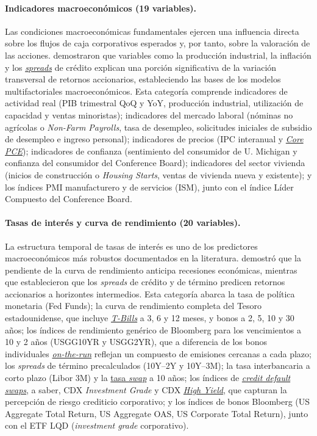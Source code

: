 \paragraph{Indicadores macroecon\'omicos (19 variables).}
Las condiciones macroecon\'omicas fundamentales ejercen una influencia directa sobre los flujos de caja corporativos esperados y, por tanto, sobre la valoraci\'on de las acciones. \citet{chen1986} demostraron que variables como la producci\'on industrial, la inflaci\'on y los \hyperlink{glos:spread}{\textit{spreads}} de cr\'edito explican una porci\'on significativa de la variaci\'on transversal de retornos accionarios, estableciendo las bases de los modelos multifactoriales macroecon\'omicos. Esta categor\'ia comprende indicadores de actividad real (PIB trimestral QoQ y YoY, producci\'on industrial, utilizaci\'on de capacidad y ventas minoristas); indicadores del mercado laboral (n\'ominas no agr\'icolas o \textit{Non-Farm Payrolls}, tasa de desempleo, solicitudes iniciales de subsidio de desempleo e ingreso personal); indicadores de precios (IPC interanual y \hyperlink{glos:core_pce}{\textit{Core PCE}}); indicadores de confianza (sentimiento del consumidor de U. Michigan y confianza del consumidor del Conference Board); indicadores del sector vivienda (inicios de construcci\'on o \textit{Housing Starts}, ventas de vivienda nueva y existente); y los \'indices PMI manufacturero y de servicios (ISM), junto con el \'indice L\'ider Compuesto del Conference Board.

\paragraph{Tasas de inter\'es y curva de rendimiento (20 variables).}
La estructura temporal de tasas de inter\'es es uno de los predictores macroecon\'omicos m\'as robustos documentados en la literatura. \citet{harvey1989} demostr\'o que la pendiente de la curva de rendimiento anticipa recesiones econ\'omicas, mientras que \citet{fama1989} establecieron que los \textit{spreads} de cr\'edito y de t\'ermino predicen retornos accionarios a horizontes intermedios. Esta categor\'ia abarca la tasa de pol\'itica monetaria (Fed Funds); la curva de rendimiento completa del Tesoro estadounidense, que incluye \hyperlink{glos:treasury}{\textit{T-Bills}} a 3, 6 y 12 meses, y bonos a 2, 5, 10 y 30 a\~nos; los \'indices de rendimiento gen\'erico de Bloomberg para los vencimientos a 10 y 2 a\~nos (USGG10YR y USGG2YR), que a diferencia de los bonos individuales \hyperlink{glos:on_the_run}{\textit{on-the-run}} reflejan un compuesto de emisiones cercanas a cada plazo; los \textit{spreads} de t\'ermino precalculados (10Y--2Y y 10Y--3M); la tasa interbancaria a corto plazo (Libor 3M) y la \hyperlink{glos:swap}{tasa \textit{swap}} a 10 a\~nos; los \'indices de \hyperlink{glos:cds}{\textit{credit default swaps}}, a saber, CDX \textit{Investment Grade} y CDX \hyperlink{glos:ig_hy}{\textit{High Yield}}, que capturan la percepci\'on de riesgo crediticio corporativo; y los \'indices de bonos Bloomberg (US Aggregate Total Return, US Aggregate OAS, US Corporate Total Return), junto con el ETF LQD (\textit{investment grade} corporativo).

